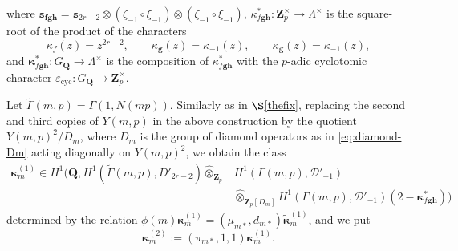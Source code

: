 \documentclass[10pt,letterpaper]{amsart}
\theoremstyle{plain}
\theoremstyle{definition}
\theoremstyle{definition}
\theoremstyle{plain}
\theoremstyle{plain}
\theoremstyle{plain}
\theoremstyle{remark}
\numberwithin{equation}{section}
\newcommand{\Q}{\mathbf{Q}}
\newcommand{\Z}{\mathbf{Z}}
\newcommand{\bff}{{\boldsymbol{f}}}
\newcommand{\bfg}{{\boldsymbol{g}}}
\newcommand{\bfh}{{\boldsymbol{h}}}
\begin{document}
where $\mathtt{s}_{\bff\bfg\bfh}=\mathtt{s}_{2r-2}\otimes(\zeta_{-1}\circ\xi_{-1})\otimes(\zeta_{-1}\circ\xi_{-1})$,  $\kappa_{f\bfg\bfh}^*:\Z_p^\times\rightarrow\Lambda^\times$ is the square-root of the product of the characters 
\begin{equation}\label{eq:char-kappa}
\kappa_f(z)=z^{2r-2},\quad\quad\kappa_{\bfg}(z)=\kappa_{-1}(z),\quad\quad\kappa_{\bfg}(z)=\kappa_{-1}(z),
\end{equation}
and $\boldsymbol{\kappa}^*_{f\bfg\bfh}:G_\Q\rightarrow\Lambda^\times$ is the composition of $\kappa_{f\bfg\bfh}^*$ with the $p$-adic cyclotomic character $\varepsilon_{\mathrm{cyc}}:G_\Q\rightarrow\Z_p^\times$. 

Let $\tilde{\Gamma}(m,p)=\Gamma(1,N(mp))$. Similarly as in $\S$\ref{thefix}, replacing the second and third copies of $Y(m,p)$ in the above construction by the quotient $Y(m,p)^2/D_m$, where $D_m$ is the group of diamond operators as in \eqref{eq:diamond-Dm} acting diagonally on $Y(m,p)^2$, we obtain the class 
\begin{equation}\label{eq:good-big-1}
\begin{aligned}
    \boldsymbol{\kappa}_m^{(1)}\in H^1\bigl(\Q,H^1(\tilde{\Gamma}(m,p),D'_{2r-2})\hat\otimes_{\Z_p} &H^1(\Gamma(m,p),\mathcal{D}'_{-1})\\ &\hat\otimes_{\Z_p[D_m]} H^1(\Gamma(m,p),\mathcal{D}'_{-1})(2-\boldsymbol{\kappa}_{f\bfg\bfh}^*)\bigr)
\end{aligned}
\end{equation}
determined by the relation $\phi(m)\boldsymbol{\kappa}_m^{(1)}=(\mu_{m*},d_{m*})\tilde{\boldsymbol{\kappa}}_m^{(1)}$, and we put
\begin{equation}\label{eq:good-big-2}
\boldsymbol{\kappa}_m^{(2)}:=(\pi_{m*},1,1)\boldsymbol{\kappa}_m^{(1)}.
\end{equation}

\end{document}

